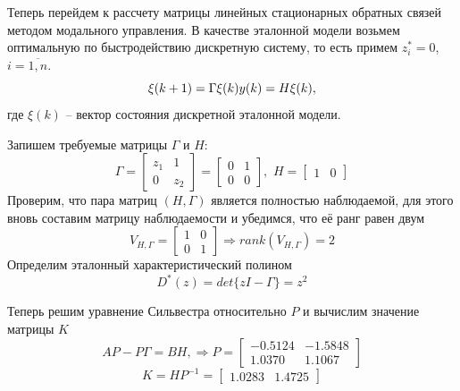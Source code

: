 Теперь перейдем к рассчету матрицы линейных стационарных обратных связей методом модального управления. В качестве эталонной модели возьмем оптимальную по быстродействию дискретную систему, то есть примем $z_i^* = 0$, $i = \overline{1, n}$.
\begin{equation}
	\xi(k+1) = \Gamma \xi(k)\\
	y(k) = H \xi(k),
\end{equation}
где $\xi(k)$ -- вектор состояния дискретной эталонной модели.

Запишем требуемые матрицы $\Gamma$ и $H$:
\begin{equation}
	\Gamma = \begin{bmatrix}
		z_1 & 1\\
		0 & z_2
	\end{bmatrix} = \begin{bmatrix}
	0 & 1\\
	0 & 0
	\end{bmatrix}, \, \, 
	H = \begin{bmatrix}
		1 & 0
	\end{bmatrix}
\end{equation}
Проверим, что пара матриц $\left(H, \Gamma \right)$ является полностью наблюдаемой, для этого вновь составим матрицу наблюдаемости и убедимся, что её ранг равен двум
\begin{equation}
	V_{H,\Gamma} = \begin{bmatrix}
		1 & 0\\
		0 & 1
	\end{bmatrix} \Rightarrow rank \left(V_{H,\Gamma}\right) = 2
\end{equation}
Определим эталонный характеристический полином
\begin{equation}
	D^*(z) = det \{zI - \Gamma\} = z^2
\end{equation}

Теперь решим уравнение Сильвестра относительно $P$ и вычислим значение матрицы $K$
\begin{equation}
	\label{1_syl_1}
	A P - P \Gamma = BH, \Rightarrow
	P = \begin{bmatrix}
	-0.5124 &	-1.5848\\
	1.0370 &	1.1067
	\end{bmatrix}
\end{equation}
\begin{equation}
	\label{1_syl_2}
	K = H P^{-1} = \begin{bmatrix}
		1.0283&	1.4725
	\end{bmatrix}
\end{equation}

